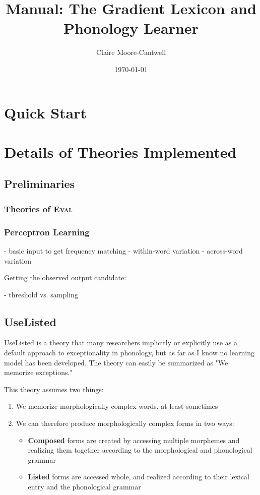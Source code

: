 \documentclass[12]{article}
\title{Manual: The Gradient Lexicon and Phonology Learner}
\author{Claire Moore-Cantwell}
\date{\today}
\begin{document}
\maketitle

\section{Quick Start}

\section{Details of Theories Implemented}
	\subsection{Preliminaries}
		\subsubsection{Theories of \textsc{Eval}}

		\subsubsection{Perceptron Learning}
		
		- basic input to get frequency matching
			- within-word variation
			- across-word variation
		
		
		Getting the observed output candidate:
		
		- threshold vs. sampling
		
		
	\subsection{UseListed}
		UseListed is a theory that many researchers implicitly or explicitly use as a default approach to exceptionality in phonology, but as far as I know no learning model has been developed.  The theory can easily be summarized as "We memorize exceptions."
		
		This theory assumes two things:
		\begin{enumerate}
			\item We memorize morphologically complex words, at least sometimes
			\item We can therefore produce morphologically complex forms in two ways:
			\begin{itemize}
				\item {\bf Composed} forms are created by accessing multiple morphemes and realizing them together according to the morphological and phonological grammar
				\item {\bf Listed} forms are accessed whole, and realized according to their lexical entry and the phonological grammar
			\end{itemize}
		\end{enumerate}
	
\end{document}

